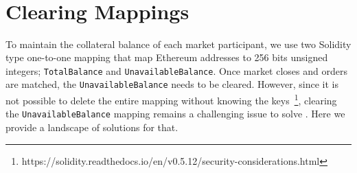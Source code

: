 \begin{table}[]
\begin{tabular}{|c|c|c|c|}
\end{tabular}
\caption{\footnotesize{}
\label{tab:worst_case_matching}}
\end{table}


\section{Clearing Mappings}



To maintain the collateral balance of each market participant, we use two Solidity type one-to-one mapping that map Ethereum addresses to 256 bits unsigned integers; \texttt{TotalBalance} and \texttt{UnavailableBalance}. Once market closes and orders are matched, the \texttt{UnavailableBalance} needs to be cleared. However, since it is not possible to delete the entire mapping without knowing the keys~\footnote{https://solidity.readthedocs.io/en/v0.5.12/security-considerations.html}, clearing the \texttt{UnavailableBalance} mapping remains a challenging issue to solve . Here we provide a landscape of solutions for that.

